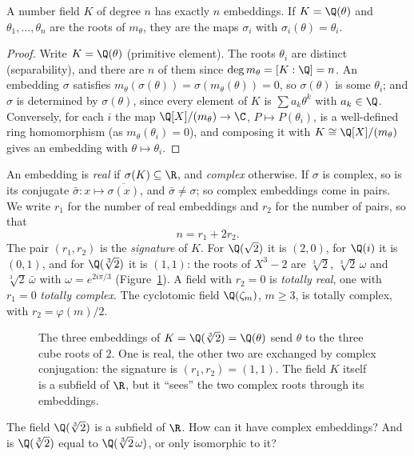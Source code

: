 \begin{proposition}\label{prop:embeddings}
A number field $K$ of degree $n$ has exactly $n$ embeddings. If $K=\Q(\theta)$ and $\theta_1,\dots,\theta_n$ are the
roots of $m_\theta$, they are the maps $\sigma_i$ with $\sigma_i(\theta)=\theta_i$.
\end{proposition}
\begin{proof}
Write $K=\Q(\theta)$ (primitive element). The roots $\theta_i$ are distinct (separability), and there are $n$ of them
since $\deg m_\theta=[K:\Q]=n$. An embedding $\sigma$ satisfies $m_\theta(\sigma(\theta))=\sigma(m_\theta(\theta))=0$,
so $\sigma(\theta)$ is some $\theta_i$; and $\sigma$ is determined by $\sigma(\theta)$, since every element of $K$ is
$\sum a_k\theta^k$ with $a_k\in\Q$. Conversely, for each $i$ the map
$\Q[X]/(m_\theta)\to\C$, $P\mapsto P(\theta_i)$, is a well-defined ring homomorphism (as $m_\theta(\theta_i)=0$), and
composing it with $K\cong\Q[X]/(m_\theta)$ gives an embedding with $\theta\mapsto\theta_i$.
\end{proof}

An embedding is \emph{real} if $\sigma(K)\subseteq\R$, and \emph{complex} otherwise. If $\sigma$ is complex, so is its
conjugate $\bar\sigma:x\mapsto\overline{\sigma(x)}$, and $\bar\sigma\ne\sigma$; so complex embeddings come in pairs.
We write $r_1$ for the number of real embeddings and $r_2$ for the number of pairs, so that
\[
n=r_1+2r_2.
\]
The pair $(r_1,r_2)$ is the \emph{signature} of $K$. For $\Q(\sqrt2)$ it is $(2,0)$, for $\Q(i)$ it is $(0,1)$, and
for $\Q(\sqrt[3]2)$ it is $(1,1)$: the roots of $X^3-2$ are $\sqrt[3]2$, $\sqrt[3]2\,\omega$ and $\sqrt[3]2\,\bar\omega$
with $\omega=e^{2i\pi/3}$ (Figure~\ref{fig:embeddings}). A field with $r_2=0$ is \emph{totally real}, one with $r_1=0$
\emph{totally complex}. The cyclotomic field $\Q(\zeta_m)$, $m\ge3$, is totally complex, with $r_2=\varphi(m)/2$.

\begin{figure}[ht]
\centering
{}
\caption{The three embeddings of $K=\Q(\sqrt[3]2)=\Q(\theta)$ send $\theta$ to the three cube roots of $2$. One is real,
the other two are exchanged by complex conjugation: the signature is $(r_1,r_2)=(1,1)$. The field $K$ itself is a
subfield of $\R$, but it ``sees'' the two complex roots through its embeddings.}
\label{fig:embeddings}
\end{figure}

\begin{think}
The field $\Q(\sqrt[3]2)$ is a subfield of $\R$. How can it have complex embeddings? And is $\Q(\sqrt[3]2)$ equal to
$\Q(\sqrt[3]2\,\omega)$, or only isomorphic to it?
\end{think}

